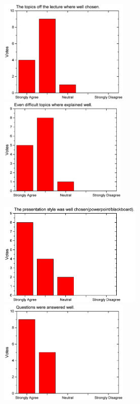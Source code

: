 \begin{figure}[H]
  \begin{minipage}{.48\linewidth}
    \centering
      {\includegraphics[height=50mm]{figures/n/Graph57.pdf}}
      {\includegraphics[height=50mm]{figures/n/Graph58.pdf}}
  \end{minipage}\quad
  \begin{minipage}{.48\linewidth}
    \centering
      {\includegraphics[height=50mm]{figures/n/Graph59.pdf}}
      {\includegraphics[height=50mm]{figures/n/Graph60.pdf}}
  \end{minipage}
\end{figure}
